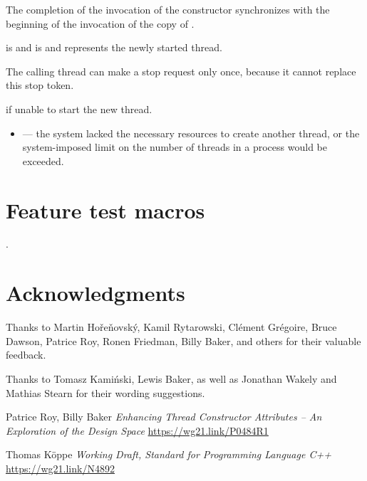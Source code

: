 \documentclass{wg21}
\begin{document}
\begin{itemdescr}
\pnum
\sync
The completion of the invocation of the constructor
synchronizes with the beginning of the invocation of the copy of .

\pnum
\ensures
{} is 
and  is 
and  represents the newly started thread.
\begin{note}
The calling thread can make a stop request only once,
because it cannot replace this stop token.
\end{note}

\pnum
\throws
{} if unable to start the new thread.

\pnum
\errors
\begin{itemize}
\item {} --- the system lacked
the necessary resources to create another thread,
or the system-imposed limit on the number of threads in a process
would be exceeded.
\end{itemize}
\end{itemdescr}

\section{Feature test macros}

.


\section{Acknowledgments}

Thanks to Martin Hořeňovský, Kamil Rytarowski, Clément Grégoire, Bruce Dawson, Patrice Roy, Ronen Friedman, Billy Baker, and others for their valuable feedback.

Thanks to Tomasz Kamiński, Lewis Baker, as well as Jonathan Wakely and Mathias Stearn for their wording suggestions.






\renewcommand{\section}[2]{}%
\begin{thebibliography}{9}
    Patrice Roy, Billy Baker
    \emph{Enhancing Thread Constructor Attributes – An Exploration of the Design Space}\newline
    \url{https://wg21.link/P0484R1}

    Thomas Köppe
    \emph{Working Draft, Standard for Programming Language C++}\newline
    \url{https://wg21.link/N4892}

\end{thebibliography}
\end{document}
